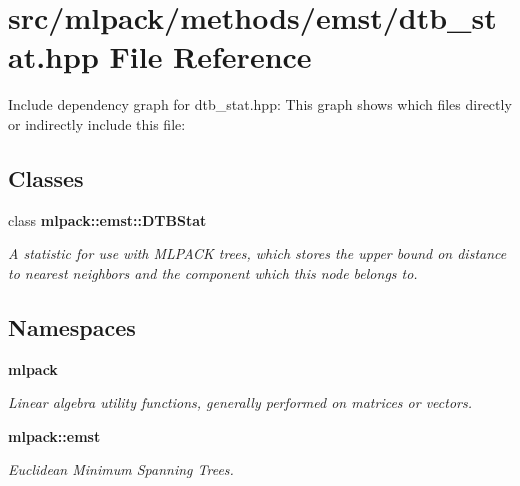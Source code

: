 \section{src/mlpack/methods/emst/dtb\-\_\-stat.hpp File Reference}
\label{dtb__stat_8hpp}
Include dependency graph for dtb\-\_\-stat.\-hpp\-:
This graph shows which files directly or indirectly include this file\-:
\subsection*{Classes}
\begin{DoxyCompactItemize}
\item 
class {\bf mlpack\-::emst\-::\-D\-T\-B\-Stat}
\begin{DoxyCompactList}\small\item\em A statistic for use with M\-L\-P\-A\-C\-K trees, which stores the upper bound on distance to nearest neighbors and the component which this node belongs to. \end{DoxyCompactList}\end{DoxyCompactItemize}
\subsection*{Namespaces}
\begin{DoxyCompactItemize}
\item 
{\bf mlpack}
\begin{DoxyCompactList}\small\item\em Linear algebra utility functions, generally performed on matrices or vectors. \end{DoxyCompactList}\item 
{\bf mlpack\-::emst}
\begin{DoxyCompactList}\small\item\em Euclidean Minimum Spanning Trees. \end{DoxyCompactList}\end{DoxyCompactItemize}
